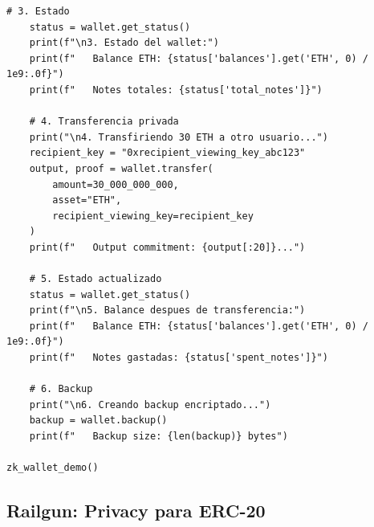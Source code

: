 \documentclass[11pt,a4paper,twoside]{book}
\theoremstyle{definition}
\theoremstyle{remark}
\begin{document}
\begin{lstlisting}[style=python, caption={Arquitectura de wallet con soporte ZK}]
    # 3. Estado
    status = wallet.get_status()
    print(f"\n3. Estado del wallet:")
    print(f"   Balance ETH: {status['balances'].get('ETH', 0) / 1e9:.0f}")
    print(f"   Notes totales: {status['total_notes']}")
    
    # 4. Transferencia privada
    print("\n4. Transfiriendo 30 ETH a otro usuario...")
    recipient_key = "0xrecipient_viewing_key_abc123"
    output, proof = wallet.transfer(
        amount=30_000_000_000,
        asset="ETH",
        recipient_viewing_key=recipient_key
    )
    print(f"   Output commitment: {output[:20]}...")
    
    # 5. Estado actualizado
    status = wallet.get_status()
    print(f"\n5. Balance despues de transferencia:")
    print(f"   Balance ETH: {status['balances'].get('ETH', 0) / 1e9:.0f}")
    print(f"   Notes gastadas: {status['spent_notes']}")
    
    # 6. Backup
    print("\n6. Creando backup encriptado...")
    backup = wallet.backup()
    print(f"   Backup size: {len(backup)} bytes")

zk_wallet_demo()
\end{lstlisting}

\subsection{Railgun: Privacy para ERC-20}
\end{document}
